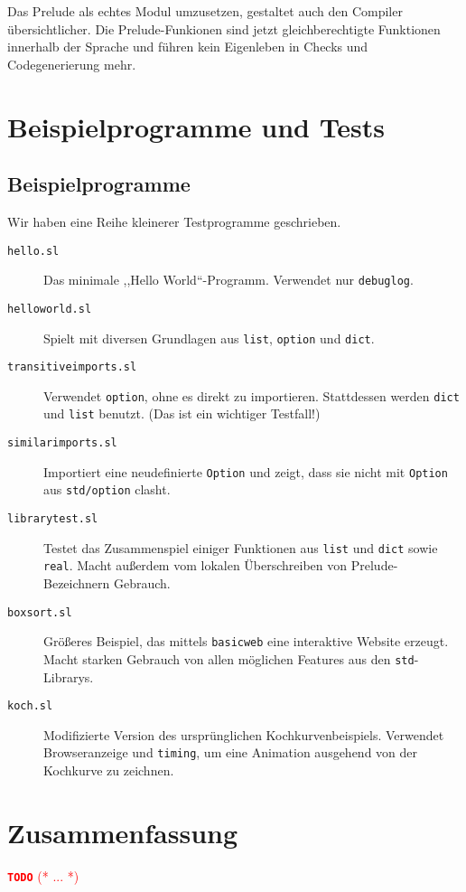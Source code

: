 \documentclass[runningheads]{llncs}
\newcommand{\TODO}[1]{ \textcolor{red}{\textbf{\texttt{\large{TODO}}} (* #1 *)}\par}
\begin{document}
Das Prelude als echtes Modul umzusetzen, gestaltet auch den Compiler
übersichtlicher. Die Prelude-Funkionen sind jetzt gleichberechtigte
Funktionen innerhalb der Sprache und führen kein Eigenleben in Checks und
Codegenerierung mehr.

\section{Beispielprogramme und Tests}
\label{sec:samples}

\subsection{Beispielprogramme}

Wir haben eine Reihe kleinerer Testprogramme geschrieben.

\begin{description}
 \item[\texttt{hello.sl}] Das minimale ,,Hello World``-Programm. Verwendet
   nur \verb|debuglog|.
 \item[\texttt{helloworld.sl}] Spielt mit diversen Grundlagen aus \verb|list|,
   \verb|option| und \verb|dict|.
 \item[\texttt{transitiveimports.sl}] Verwendet \verb|option|, ohne es direkt
   zu importieren. Stattdessen werden \verb|dict| und \verb|list| benutzt.
   (Das ist ein wichtiger Testfall!)
 \item[\texttt{similarimports.sl}] Importiert eine neudefinierte \verb|Option|
   und zeigt, dass sie nicht mit \verb|Option| aus \verb|std/option| clasht.
 \item[\texttt{librarytest.sl}] Testet das Zusammenspiel einiger Funktionen aus
   \verb|list| und \verb|dict| sowie \verb|real|. Macht außerdem vom lokalen
   Überschreiben von Prelude-Bezeichnern Gebrauch.
 \item[\texttt{boxsort.sl}] Größeres Beispiel, das mittels \verb|basicweb| eine
   interaktive Website erzeugt. Macht starken Gebrauch von allen möglichen
   Features aus den \verb|std|-Librarys.
 \item[\texttt{koch.sl}] Modifizierte Version des ursprünglichen
   Kochkurvenbeispiels. Verwendet Browseranzeige und \verb|timing|, um eine
   Animation ausgehend von der Kochkurve zu zeichnen.
\end{description}

\section{Zusammenfassung}

\TODO{...}
\end{document}
